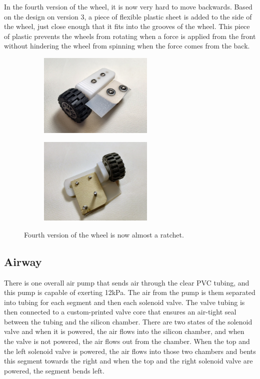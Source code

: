 \documentclass[twoside, 11pt]{article}
\begin{document}
In the fourth version of the wheel, it is now very hard to move backwards. Based on the design on version 3, a piece of flexible plastic sheet is added to the side of the wheel, just close enough that it fits into the grooves of the wheel. This piece of plastic prevents the wheels from rotating when a force is applied from the front without hindering the wheel from spinning when the force comes from the back. 

\begin{figure} [H]
\centering
\begin{subfigure}[b]{0.5\linewidth}
		\centering
		\includegraphics[width=0.6\textwidth]{wheel4side}
		\subcaption{}
	\end{subfigure}%
	\begin{subfigure}[b]{0.5\linewidth}
		\centering		
		\includegraphics[width=0.6\textwidth]{wheel4top}
		\subcaption{}
	\end{subfigure}
	\caption{Fourth version of the wheel is now almost a ratchet. }
\end{figure}

\subsection{Airway}
There is one overall air pump that sends air through the clear PVC tubing, and this pump is capable of exerting 12kPa. The air from the pump is them separated into tubing for each segment and then each solenoid valve. The valve tubing is then connected to a custom-printed valve core that ensures an air-tight seal between the tubing and the silicon chamber. There are two states of the solenoid valve and when it is powered, the air flows into the silicon chamber, and when the valve is not powered, the air flows out from the chamber. When the top and the left solenoid valve is powered, the air flows into those two chambers and bents this segment towards the right and when the top and the right solenoid valve are powered, the segment bends left. 
\end{document}
